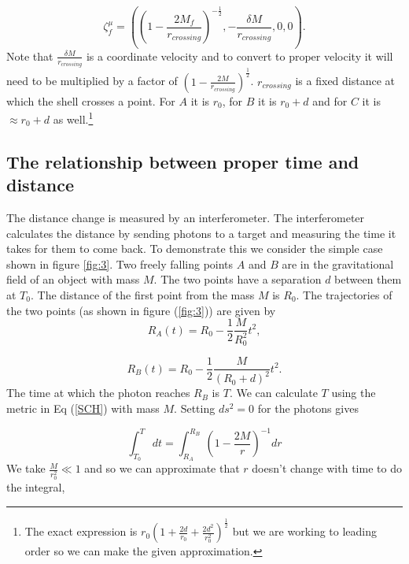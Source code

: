 \documentclass[aps,showpacs,onecolumn,floats,prd,superscriptaddress,nofootinbib]{revtex4-1}
\begin{document}
\begin{equation}
	\zeta^\mu_{f} = \left( \left( 1 - \frac{2M_f}{r_{crossing}} \right)^{-\frac{1}{2}}, - \frac{\delta M}{r_{crossing}}, 0, 0 \right).	\label{5}
\end{equation}
Note that $\frac{\delta M}{r_{crossing}}$ is a coordinate velocity and to convert to proper velocity it will need to be multiplied by a factor of $\left( 1 - \frac{2M}{r_{crossing}} \right)^\frac{1}{2}$. $r_{crossing}$ is a fixed distance at which the shell crosses a point. For $A$ it is $r_0$, for $B$ it is $r_0 + d$ and for $C$ it is $\approx r_0 + d$ as well.\footnote{The exact expression is $r_0 \left( 1 + \frac{2d}{r_0} + \frac{2d^2}{r_0^2} \right)^\frac{1}{2}$ but we are working to leading order so we can make the given approximation.}

\subsection{The relationship between proper time and distance}\label{concept}

The distance change is measured by an interferometer. The interferometer calculates the distance by sending photons to a target and measuring the time it takes for them to come back. To demonstrate this we consider the simple case shown in figure \ref{fig:3}. Two freely falling points $A$ and $B$ are in the gravitational field of an object with mass $M$. The two points have a separation $d$ between them at $T_0$. The distance of the first point from the mass $M$ is $R_0$. The trajectories of the two points (as shown in figure (\ref{fig:3})) are given by
\begin{equation}
	R_A(t) = R_0 - \frac{1}{2} \frac{M}{R_0^2} t^2,
\end{equation}

\begin{equation}
	R_B(t) = R_0 - \frac{1}{2} \frac{M}{(R_0 + d)^2} t^2.
\end{equation}
The time at which the photon reaches $R_B$ is $T$. We can calculate $T$ using the metric in Eq (\ref{SCH}) with mass $M$. Setting $ds^2 = 0$ for the photons gives

\begin{equation}
	\int^T_{T_0} \ dt = \int^{R_B}_{R_A} \ \left( 1 - \frac{2M}{r} \right)^{-1} dr 
\end{equation}
We take $\frac{M}{r_0^2}\ll 1$ and so we can approximate that $r$ doesn't change with time to do the integral,
\end{document}
